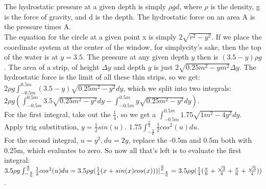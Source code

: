 \documentclass[10pt]{article}
\begin{document}
The hydrostatic pressure at a given depth is simply \(\rho g d\), where \(\rho\) is the density, g is the force of gravity, and d is the depth. The hydrostatic force on an area A is the pressure times A.\\
The equation for the circle at a given point x is simply \(2\sqrt{r^2-y^2}\).
If we place the coordinate system at the center of the window, for simplycity's sake, then the top of the water is at \(y=3.5\). The pressure at any given depth \(y\) then is \((3.5-y)\rho g\). The area of a strip, of height \(\Delta y\) and depth \(y\) is just \(2\sqrt{0.25m^2-ym^2}\Delta y\). The hydrostatic force is the limit of all these thin strips, so we get:\\
2\(\rho g\int_{-0.5m}^{0.5m}(3.5-y)\sqrt{0.25m^2-y^2}dy\), which we split into two integrals:\\
\(2\rho g(\int_{-0.5m}^{0.5m}3.5\sqrt{0.25m^2-y^2}dy-\int_{-0.5m}^{0.5m}y\sqrt{0.25m^2-y^2}dy)\).\\
For the first integral, take out the \(\frac{1}{4}\), so we get a \(\int_{-0.5m}^{0.5m}1.75\sqrt{1m^2-4y^2}dy\). Apply trig substitution, \(y=\frac{1}{2}sin(u)\). \(1.75\int_{-\frac{\pi}{6}}^{\frac{\pi}{6}}\frac{1}{2}cos^2(u)du\).\\
For the second integral, \(u=y^2, du=2y\), replace the -0.5m and 0.5m both with 0.25m, which evaluates to zero. So now all that's left is to evaluate the first integral:\\
\(3.5\rho g\int_{-\frac{\pi}{6}}^{\frac{\pi}{6}}\frac{1}{2}cos^2(u)du = 3.5\rho g(\frac{1}{4}(x+sin(x)cos(x)))|_{-\frac{\pi}{6}}^{\frac{\pi}{6}} =\\
3.5\rho g(\frac{1}{4}(\frac{\pi}{6}+\frac{\sqrt{3}}{4}+\frac{\pi}{6}+\frac{\sqrt{3}}{4}))\).
\end{document}
